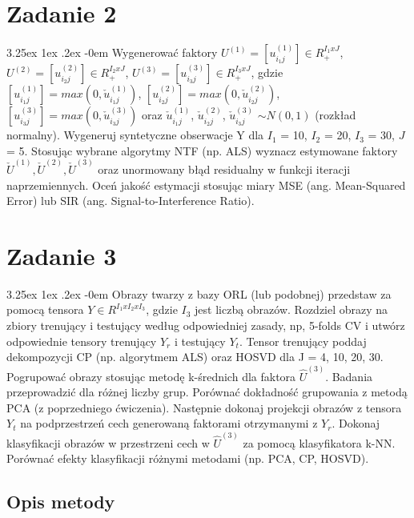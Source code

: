 \documentclass[11pt, a4paper]{article}
\makeatletter
\renewcommand\paragraph{\@startsection{paragraph}{5}{\z@}
  {3.25ex \@plus1ex \@minus.2ex}
  {-0em}
  {\normalfont\normalsize\bfseries}}
\makeatother
\begin{document}
\section{Zadanie 2}
\paragraph{}
Wygenerować faktory 
$U^(1) = [u^{(1)}_{i_1j}] \in R_+^{I_1xJ}$,
 $U^(2) = [u^{(2)}_{i_2j}] \in R_+^{I_2xJ}$,
  $U^(3) = [u^{(3)}_{i_3j}] \in R_+^{I_3xJ}$,
  gdzie 
  $[u^{(1)}_{i_1j}] = max(0, \check{u}^{(1)}_{i_1j})$,
  $[u^{(2)}_{i_2j}] = max(0, \check{u}^{(2)}_{i_2j})$,
  $[u^{(3)}_{i_3j}] = max(0, \check{u}^{(3)}_{i_3j})$
  oraz
  $\check{u}^{(1)}_{i_1j}$,
  $\check{u}^{(2)}_{i_2j}$,
  $\check{u}^{(3)}_{i_3j}$
  $\sim N(0,1)$ (rozkład normalny). 
  Wygeneruj syntetyczne obserwacje Y dla 
  $I_1$ = 10, 
  $I_2$ = 20, 
  $I_3$ = 30, 
  $J$ = 5. 
  Stosując wybrane algorytmy NTF (np. ALS) wyznacz estymowane faktory $\check{U}^{(1)}, \check{U}^{(2)}, \check{U}^{(3)}$ oraz unormowany błąd residualny w funkcji iteracji naprzemiennych. Oceń jakość estymacji stosując miary MSE (ang. Mean-Squared Error) lub SIR (ang. Signal-to-Interference Ratio).

\section{Zadanie 3}
\paragraph{}
Obrazy twarzy z bazy ORL (lub podobnej) przedstaw za pomocą tensora $Y \in R^{I_1xI_2xI_3}$, gdzie $I_3$ jest liczbą obrazów. Rozdziel obrazy na zbiory trenujący i testujący według odpowiedniej zasady, np, 5-folds CV i utwórz odpowiednie tensory trenujący $Y_r$ i testujący $Y_t$. Tensor trenujący poddaj dekompozycji CP (np. algorytmem ALS) oraz HOSVD dla J = 4, 10, 20, 30. Pogrupować obrazy stosując metodę k-średnich dla faktora $\widehat{U}^{(3)}$. Badania przeprowadzić dla różnej liczby grup. Porównać dokładność grupowania z metodą PCA (z poprzedniego ćwiczenia). Następnie dokonaj projekcji obrazów z tensora $Y_t$ na podprzestrzeń cech generowaną faktorami otrzymanymi z $Y_r$. Dokonaj klasyfikacji obrazów w przestrzeni cech w $\widehat{U}^{(3)}$ za pomocą klasyfikatora k-NN. Porównać efekty klasyfikacji różnymi metodami (np. PCA, CP, HOSVD).

\subsection{Opis metody}
\end{document}
